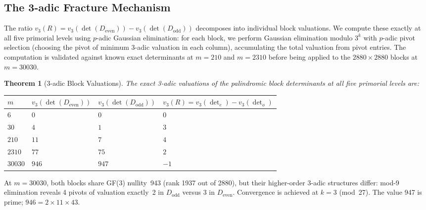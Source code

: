 \documentclass[11pt,letterpaper]{article}
\newtheorem{theorem}{Theorem}[section]
\theoremstyle{definition}
\begin{document}
\subsection{The 3-adic Fracture Mechanism}

The ratio $v_3(R) = v_3(\det(D_{\text{even}})) - v_3(\det(D_{\text{odd}}))$ decomposes into individual block valuations. We compute these exactly at all five primorial levels using $p$-adic Gaussian elimination: for each block, we perform Gaussian elimination modulo $3^k$ with $p$-adic pivot selection (choosing the pivot of minimum 3-adic valuation in each column), accumulating the total valuation from pivot entries. The computation is validated against known exact determinants at $m = 210$ and $m = 2310$ before being applied to the $2880 \times 2880$ blocks at $m = 30030$.

\begin{theorem}[3-adic Block Valuations]
The exact 3-adic valuations of the palindromic block determinants at all five primorial levels are:
\end{theorem}

\begin{center}
\begin{tabular}{@{}llll@{}}
\toprule
$m$ & $v_3(\det(D_{\text{even}}))$ & $v_3(\det(D_{\text{odd}}))$ & $v_3(R) = v_3(\det_e) - v_3(\det_o)$ \\
\midrule
$6$     & $0$   & $0$   & $0$  \\
$30$    & $4$   & $1$   & $3$  \\
$210$   & $11$  & $7$   & $4$  \\
$2310$  & $77$  & $75$  & $2$  \\
$30030$ & $946$ & $947$ & $-1$ \\
\bottomrule
\end{tabular}
\end{center}

At $m = 30030$, both blocks share GF(3) nullity~943 (rank 1937 out of 2880), but their higher-order 3-adic structures differ: mod-9 elimination reveals 4 pivots of valuation exactly~2 in $D_{\text{odd}}$ versus 3 in $D_{\text{even}}$. Convergence is achieved at $k = 3$ (mod~27). The value 947 is prime; $946 = 2 \times 11 \times 43$.
\end{document}
